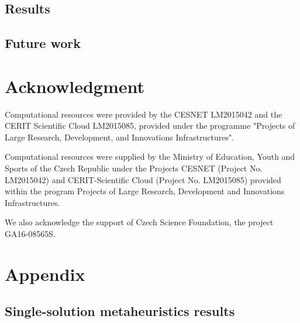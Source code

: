 \documentclass[
  print, %
  Table,   %
  nolof,     %
  nolot,     %
  11pt, %
  oneside  %
]{fithesis3}
\begin{document}
\section{Results}
\label{sec:conclusion-results}
\section{Future work}
\label{sec:conclusion-future}

\chapter*{Acknowledgment}
\label{chap:ack}

Computational resources were provided by the CESNET LM2015042 and the CERIT Scientific Cloud LM2015085, provided under the programme "Projects of Large Research, Development, and Innovations Infrastructures".

Computational resources were supplied by the Ministry of Education, Youth and Sports of the Czech Republic under the Projects CESNET (Project No. LM2015042) and CERIT-Scientific Cloud (Project No. LM2015085) provided within the program Projects of Large Research, Development and Innovations Infrastructures.

We also acknowledge the support of Czech Science Foundation, the project GA16-08565S.


\printbibliography[heading=bibintoc] %

\chapter*{Appendix}
\label{chap:app}

\section{Single-solution metaheuristics results}
\label{sec:app-ss-res}
\end{document}

